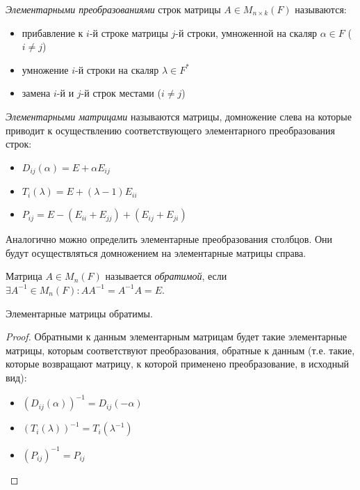 \begin{definition}
	\textit{Элементарными преобразованиями} строк матрицы $A \in M_{n \times k}(F)$ называются:
	\begin{itemize}
		\item прибавление к $i$-й строке матрицы $j$-й строки, умноженной на скаляр $\alpha \in F$ ($i \ne j$)
		\item умножение $i$-й строки на скаляр $\lambda \in F^*$
		\item замена $i$-й и $j$-й строк местами ($i \ne j$)
	\end{itemize}
\end{definition}

\begin{definition}
	\textit{Элементарными матрицами} называются матрицы, домножение слева
	на которые приводит к осуществлению соответствующего элементарного преобразования строк:
	\begin{itemize}
		\item $D_{ij}(\alpha) = E + \alpha E_{ij}$
		\item $T_{i}(\lambda) = E + (\lambda - 1) E_{ii}$
		\item $P_{ij} = E - (E_{ii} + E_{jj}) + (E_{ij} + E_{ji})$
	\end{itemize}
\end{definition}

\begin{note}
	Аналогично можно определить элементарные преобразования столбцов. Они будут осуществляться домножением на элементарные матрицы справа.
\end{note}

\begin{definition}
	Матрица $A \in M_n(F)$ называется \textit{обратимой}, если $\exists A^{-1} \in M_n(F): AA^{-1} = A^{-1}A = E$.
\end{definition}

\begin{proposition}
	Элементарные матрицы обратимы.
\end{proposition}

\begin{proof}
	Обратными к данным элементарным матрицам будет такие элементарные матрицы, которым соответствуют преобразования, обратные к данным (т.\:е. такие, которые возвращают матрицу, к которой применено преобразование, в исходный вид):
	\begin{itemize}
		\item $(D_{ij}(\alpha))^{-1} = D_{ij}(-\alpha)$
		\item $(T_{i}(\lambda))^{-1} = T_{i}(\lambda^{-1})$
		\item $(P_{ij})^{-1} = P_{ij}$
	\end{itemize}
\end{proof}

